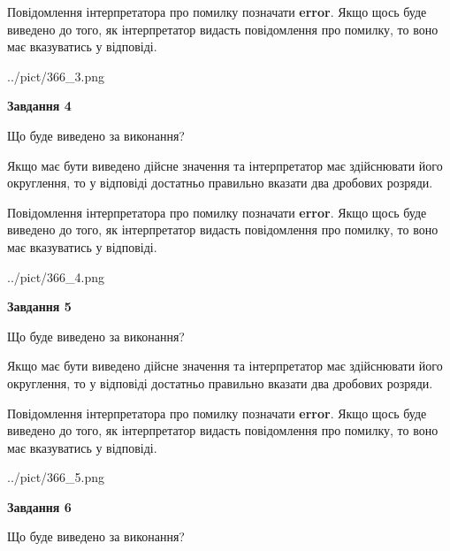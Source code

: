 \documentclass[12pt, ukrainian]{article}
\begin{document}
{\begin {Large}
Повідомлення інтерпретатора про помилку позначати \textbf{error}.
Якщо щось буде виведено до того, як інтерпретатор видасть повідомлення про помилку, 
то воно має вказуватись у відповіді. \par

\begin{center}
	{../pict/366_3.png}
\end{center}
\newpage

{\begin {center}\textbf{Завдання 4}\end {center}}\par
Що буде виведено за виконання? \par

Якщо має бути виведено дійсне значення та інтерпретатор має здійснювати його округлення, 
то у відповіді достатньо правильно вказати два дробових розряди.

Повідомлення інтерпретатора про помилку позначати \textbf{error}.
Якщо щось буде виведено до того, як інтерпретатор видасть повідомлення про помилку, 
то воно має вказуватись у відповіді. \par

\begin{center}
	{../pict/366_4.png}
\end{center}
\newpage

{\begin {center}\textbf{Завдання 5}\end {center}}\par
Що буде виведено за виконання? \par

Якщо має бути виведено дійсне значення та інтерпретатор має здійснювати його округлення, 
то у відповіді достатньо правильно вказати два дробових розряди.

Повідомлення інтерпретатора про помилку позначати \textbf{error}.
Якщо щось буде виведено до того, як інтерпретатор видасть повідомлення про помилку, 
то воно має вказуватись у відповіді. \par

\begin{center}
	{../pict/366_5.png}
\end{center}
\newpage

{\begin {center}\textbf{Завдання 6}\end {center}}\par
Що буде виведено за виконання? \par


\end{Large}}
\end{document}
